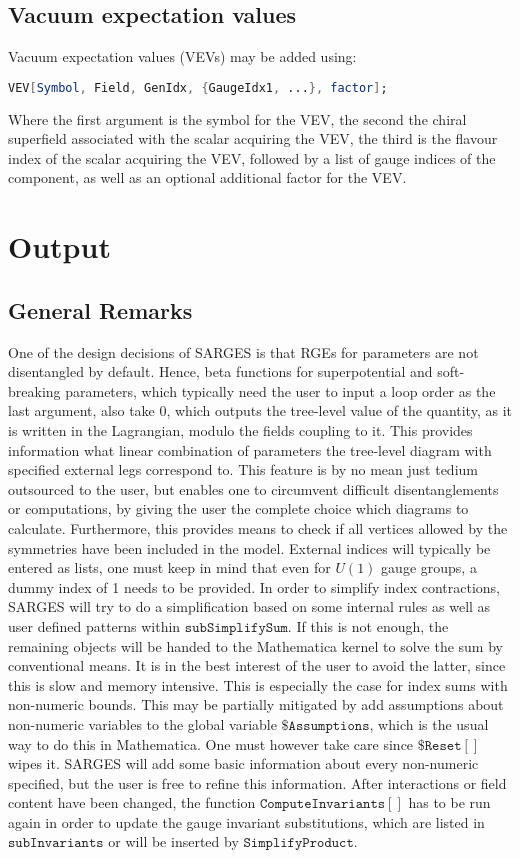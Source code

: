 \documentclass{scrartcl}
\begin{document}
\subsection{Vacuum expectation values}
Vacuum expectation values (VEVs) may be added using:
\begin{lstlisting}[language=mathematica,mathescape,columns=flexible,backgroundcolor=\color{light-gray}]
VEV[Symbol, Field, GenIdx, {GaugeIdx1, ...}, factor];
\end{lstlisting}
Where the first argument is the symbol for the VEV, the second the chiral superfield associated with the scalar acquiring the VEV, the third is the flavour index of the scalar acquiring the VEV, followed by a list of gauge indices of the component, as well as an optional additional factor for the VEV.
\FloatBarrier
\section{Output}
\subsection{General Remarks}
One of the design decisions of SARGES is that RGEs for parameters are not disentangled by default. Hence, beta functions for superpotential and soft-breaking parameters, which typically need the user to input a loop order as the last argument, also take 0, which outputs the tree-level value of the quantity, as it is written in the Lagrangian, modulo the fields coupling to it. This provides information what linear combination of parameters the tree-level diagram with specified external legs correspond to. This feature is by no mean just tedium outsourced to the user, but enables one to circumvent difficult disentanglements or computations, by giving the user the complete choice which diagrams to calculate. Furthermore, this provides means to check if all vertices allowed by the symmetries have been included in the model.
\newline
External indices will typically be entered as lists, one must keep in mind that even for $U(1)$ gauge groups, a dummy index of 1 needs to be provided. In order to simplify index contractions, SARGES will try to do a simplification based on some internal rules as well as user defined patterns within $\mathtt{subSimplifySum}$. If this is not enough, the remaining objects will be handed to the Mathematica kernel to solve the sum by conventional means. It is in the best interest of the user to avoid the latter, since this is slow and memory intensive. This is especially the case for index sums with non-numeric bounds. This may be partially mitigated by add assumptions about non-numeric variables to the global variable  $\mathtt{\$Assumptions}$, which is the usual way to do this in Mathematica. One must however take care since $\mathtt{\$Reset[]}$ wipes it. SARGES will add some basic information about every non-numeric specified, but the user is free to refine this information.
\newline
After interactions or field content have been changed, the function $\mathtt{ComputeInvariants[]}$ has to be run again in order to update the gauge invariant substitutions, which are listed in $\mathtt{subInvariants}$ or will be inserted by $\mathtt{SimplifyProduct}$.
\end{document}
